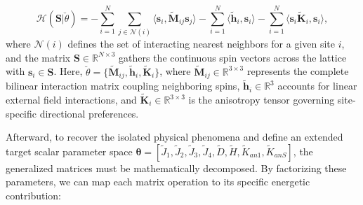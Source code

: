 \documentclass[a4paper,fleqn]{cas-sc}
\begin{document}
\begin{equation}\label{eq:GeneralizedHamiltonian}
\mathcal{H}\left(\mathbf{S}| \breve{\theta}\right) = 
- \sum_{i=1}^{N}\sum_{j\in \mathcal{N}(i)} 
    \langle \mathbf{s}_i, \tilde{\mathbf{M}}_{ij}\mathbf{s}_j \rangle
- \sum_{i=1}^{N} \langle\tilde{\mathbf{h}}_{i},\mathbf{s}_i\rangle 
- \sum_{i=1}^{N} \langle\mathbf{s}_i \tilde{\mathbf{K}}_i, 
    \mathbf{s}_i\rangle,
\end{equation}
where $\mathcal{N}(i)$ defines the set of interacting nearest neighbors for a given site $i$, and the matrix $\mathbf{S}\in\mathbb{R}^{N\times 3}$ 
gathers the continuous spin vectors across the lattice with 
$\mathbf{s}_i\in\mathbf{S}$. Here, 
$\breve{\theta}=\{\tilde{\mathbf{M}}_{ij},\tilde{\mathbf{h}}_{i},
\tilde{\mathbf{K}}_{i}\}$, where 
$\tilde{\mathbf{M}}_{ij} \in \mathbb{R}^{3 \times 3}$ represents the complete bilinear interaction matrix coupling neighboring spins, $\tilde{\mathbf{h}}_i \in \mathbb{R}^{3}$ accounts for linear external field interactions, and $\tilde{\mathbf{K}}_i \in \mathbb{R}^{3 \times 3}$ 
is the anisotropy tensor governing site-specific directional preferences.

Afterward, to recover the isolated physical phenomena and define an extended target scalar parameter space 
$\boldsymbol{\theta}=[\tilde{J}_1,\tilde{J}_2,\tilde{J}_3,\tilde{J}_4,
\tilde{D},\tilde{H},\tilde{K}_{an1},\tilde{K}_{anS}]$, the generalized matrices must be mathematically decomposed. By factorizing these parameters, we can map each matrix operation to its specific energetic contribution:
\end{document}

